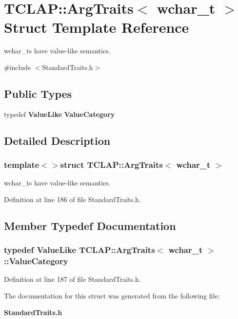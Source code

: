 \section{T\+C\+L\+A\+P\+:\+:Arg\+Traits$<$ wchar\+\_\+t $>$ Struct Template Reference}
\label{structTCLAP_1_1ArgTraits_3_01wchar__t_01_4}


wchar\+\_\+ts have value-\/like semantics.  




{\ttfamily \#include $<$Standard\+Traits.\+h$>$}

\subsection*{Public Types}
\begin{DoxyCompactItemize}
\item 
typedef {\bf Value\+Like} {\bf Value\+Category}
\end{DoxyCompactItemize}


\subsection{Detailed Description}
\subsubsection*{template$<$$>$struct T\+C\+L\+A\+P\+::\+Arg\+Traits$<$ wchar\+\_\+t $>$}

wchar\+\_\+ts have value-\/like semantics. 

Definition at line 186 of file Standard\+Traits.\+h.



\subsection{Member Typedef Documentation}
\subsubsection[{Value\+Category}]{\setlength{\rightskip}{0pt plus 5cm}typedef {\bf Value\+Like} {\bf T\+C\+L\+A\+P\+::\+Arg\+Traits}$<$ wchar\+\_\+t $>$\+::{\bf Value\+Category}}\label{structTCLAP_1_1ArgTraits_3_01wchar__t_01_4_a49a311297a394637af4d8d64eda7f442}


Definition at line 187 of file Standard\+Traits.\+h.



The documentation for this struct was generated from the following file\+:\begin{DoxyCompactItemize}
\item 
{\bf Standard\+Traits.\+h}\end{DoxyCompactItemize}
